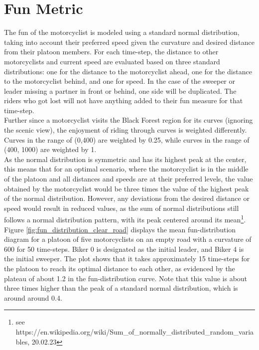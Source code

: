 \section{Fun Metric}
\label{sec:Fun Metric}
The fun of the motorcyclist is modeled using a standard normal distribution, taking into account their preferred speed given the curvature and desired distance from their platoon members. For each time-step, the distance to other motorcyclists and current speed are evaluated based on three standard distributions: one for the distance to the motorcyclist ahead, one for the distance to the motorcyclist behind, and one for speed. In the case of the sweeper or leader missing a partner in front or behind, one side will be duplicated. The riders who got lost will not have anything added to their fun measure for that time-step. \\
Further since a motorcyclist visits the Black Forest region for its curves (ignoring the scenic view), the enjoyment of riding through curves is weighted differently. Curves in the range of (0,400) are weighted by 0.25, while curves in the range of (400, 1000) are weighted by 1.\\
As the normal distribution is symmetric and has its highest peak at the center, this means that for an optimal scenario, where the motorcyclist is in the middle of the platoon and all distances and speeds are at their preferred levels, the value obtained by the motorcyclist would be three times the value of the highest peak of the normal distribution. However, any deviations from the desired distance or speed would result in reduced values, as the sum of normal distributions still follows a normal distribution pattern, with its peak centered around its mean\footnote{see https://en.wikipedia.org/wiki/Sum\_of\_normally\_distributed\_random\_variables, 20.02.23}. Figure \ref{fig:fun_distribution_clear_road} displays the mean fun-distribution diagram for a platoon of five motorcyclists on an empty road with a curvature of 600 for 50 time-steps. Biker 0 is designated as the initial leader, and Biker 4 is the initial sweeper. The plot shows that it takes approximately 15 time-steps for the platoon to reach its optimal distance to each other, as evidenced by the plateau of about 1.2 in the fun-distribution curve. Note that this value is about three times higher than the peak of a standard normal distribution, which is around around 0.4.\\

